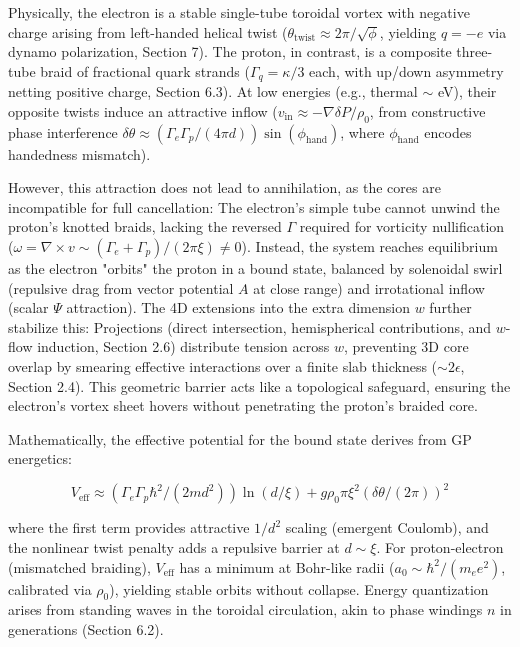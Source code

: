\documentclass{article}
\begin{document}
Physically, the electron is a stable single-tube toroidal vortex with negative charge arising from left-handed helical twist ($\theta_{\text{twist}} \approx 2\pi / \sqrt{\phi}$, yielding $q = -e$ via dynamo polarization, Section 7). The proton, in contrast, is a composite three-tube braid of fractional quark strands ($\Gamma_q = \kappa / 3$ each, with up/down asymmetry netting positive charge, Section 6.3). At low energies (e.g., thermal $\sim$ eV), their opposite twists induce an attractive inflow ($v_{\text{in}} \approx - \nabla \delta P / \rho_0$, from constructive phase interference $\delta \theta \approx (\Gamma_e \Gamma_p / (4\pi d)) \sin(\phi_{\text{hand}})$, where $\phi_{\text{hand}}$ encodes handedness mismatch).

However, this attraction does not lead to annihilation, as the cores are incompatible for full cancellation: The electron's simple tube cannot unwind the proton's knotted braids, lacking the reversed $\Gamma$ required for vorticity nullification ($\omega = \nabla \times v \sim (\Gamma_e + \Gamma_p) / (2\pi \xi) \neq 0$). Instead, the system reaches equilibrium as the electron "orbits" the proton in a bound state, balanced by solenoidal swirl (repulsive drag from vector potential $A$ at close range) and irrotational inflow (scalar $\Psi$ attraction). The 4D extensions into the extra dimension $w$ further stabilize this: Projections (direct intersection, hemispherical contributions, and $w$-flow induction, Section 2.6) distribute tension across $w$, preventing 3D core overlap by smearing effective interactions over a finite slab thickness ($\sim 2\epsilon$, Section 2.4). This geometric barrier acts like a topological safeguard, ensuring the electron's vortex sheet hovers without penetrating the proton's braided core.

Mathematically, the effective potential for the bound state derives from GP energetics:

\[
V_{\text{eff}} \approx (\Gamma_e \Gamma_p \hbar^2 / (2 m d^2)) \ln(d / \xi) + g \rho_0 \pi \xi^2 (\delta \theta / (2\pi))^2
\]

where the first term provides attractive $1/d^2$ scaling (emergent Coulomb), and the nonlinear twist penalty adds a repulsive barrier at $d \sim \xi$. For proton-electron (mismatched braiding), $V_{\text{eff}}$ has a minimum at Bohr-like radii ($a_0 \sim \hbar^2 / (m_e e^2)$, calibrated via $\rho_0$), yielding stable orbits without collapse. Energy quantization arises from standing waves in the toroidal circulation, akin to phase windings $n$ in generations (Section 6.2).
\end{document}
